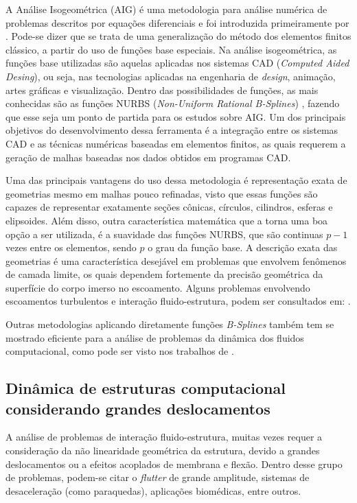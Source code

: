 A Análise Isogeométrica (AIG) é uma metodologia para análise numérica de problemas descritos por equações diferenciais e foi introduzida primeiramente por . Pode-se dizer que se trata de uma generalização do método dos elementos finitos clássico, a partir do uso de funções base especiais. Na análise isogeométrica, as funções base utilizadas são aquelas aplicadas nos sistemas CAD (\textit{Computed Aided Desing}), ou seja, nas tecnologias aplicadas na engenharia de \textit{design}, animação, artes gráficas e visualização.  Dentro das possibilidades de funções, as mais conhecidas são as funções NURBS (\textit{Non-Uniform Rational B-Splines}) \cite{PiegT:1996}, fazendo que esse seja um ponto de partida para os estudos sobre AIG. Um dos principais objetivos do desenvolvimento dessa ferramenta é a integração entre os sistemas CAD e as técnicas numéricas baseadas em elementos finitos, as quais requerem a geração de malhas baseadas nos dados obtidos em programas CAD. 
		
Uma das principais vantagens do uso dessa metodologia é representação exata de geometrias mesmo em malhas pouco refinadas, visto que essas funções são capazes de representar exatamente seções cônicas, círculos, cilindros, esferas e elipsoides. Além disso, outra característica matemática que a torna uma boa opção a ser utilizada, é a suavidade das funções NURBS, que são continuas $p-1$ vezes entre os elementos, sendo $p$ o grau da função base. A descrição exata das geometrias é uma característica desejável em problemas que envolvem fenômenos de camada limite, os quais dependem fortemente da precisão geométrica da superfície do corpo imerso no escoamento. Alguns problemas envolvendo escoamentos turbulentos e interação fluido-estrutura, podem ser consultados em: .
	
Outras metodologias aplicando diretamente funções \textit{B-Splines} também tem se mostrado eficiente para a análise de problemas da dinâmica dos fluidos computacional, como pode ser visto nos trabalhos de .


\subsection{Dinâmica de estruturas computacional considerando grandes deslocamentos}
\label{csdsection}

A análise de problemas de interação fluido-estrutura, muitas vezes requer a consideração da não linearidade geométrica da estrutura, devido a grandes deslocamentos ou a efeitos acoplados de membrana e flexão. Dentro desse grupo de problemas, podem-se citar o \textit{flutter} de grande amplitude, sistemas de desaceleração (como paraquedas), aplicações biomédicas, entre outros.

